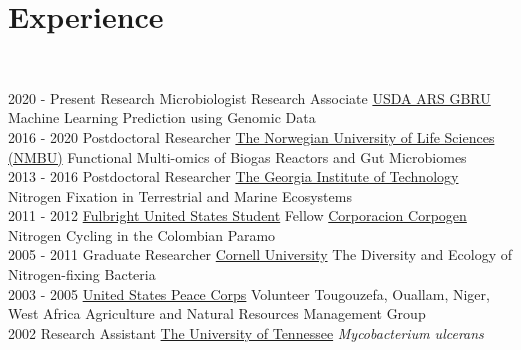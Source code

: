\documentclass[letterpaper]{twentysecondcv3} %
\begin{document}

\section{Experience}\\
\begin{twenty} %
\twentyitem
    	{2020 -}
		{Present}
        {Research Microbiologist Research Associate}
        {\href{https://www.ars.usda.gov/southeast-area/stoneville-ms/genomics-and-bioinformatics-research/}{USDA ARS GBRU}}
        {Machine Learning Prediction using Genomic Data}\\

    \twentyitem
    	{2016 -}
		{2020}
        {Postdoctoral Researcher}
        {\href{https://www.nmbu.no/}{The Norwegian University of Life Sciences (NMBU)}}
        {Functional Multi-omics of Biogas Reactors and Gut Microbiomes}\\

    \twentyitem
   	{2013 -}
		{2016}
        {Postdoctoral Researcher}
        {\href{https://www.gatech.edu/}{The Georgia Institute of Technology}}
        {Nitrogen Fixation in Terrestrial and Marine Ecosystems}\\

    \twentyitem
   	{2011 -}
		{2012}
        {\href{https://us.fulbrightonline.org/}{Fulbright United States Student} Fellow}
        {\href{https://www.corpogen.org/}{Corporacion Corpogen}}
        {Nitrogen Cycling in the Colombian Paramo}\\

    \twentyitem
   	{2005 -}
		{2011}
        {Graduate Researcher}
        {\href{https://www.cornell.edu/}{Cornell University}}
        {The Diversity and Ecology of Nitrogen-fixing Bacteria}\\

    \twentyitem
   	{2003 -}
		{2005}
        {\href{https://www.peacecorps.gov/}{United States Peace Corps} Volunteer}
        {Tougouzefa, Ouallam, Niger, West Africa}
        {Agriculture and Natural Resources Management Group}\\

    \twentyitem
   	{2002}
		{}
        {Research Assistant}
        {\href{https://www.utk.edu/}{The University of Tennessee}}
        {\textit{Mycobacterium ulcerans}}\\


\end{twenty}
\end{document}
